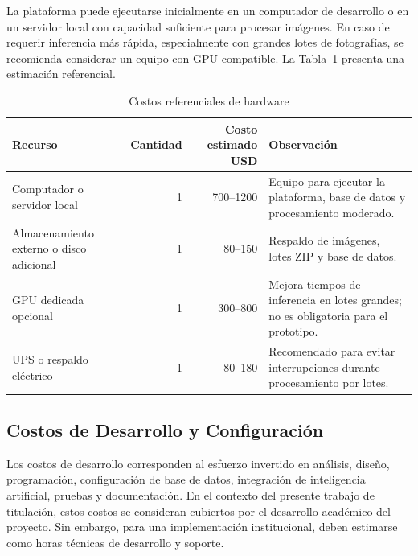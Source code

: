 La plataforma puede ejecutarse inicialmente en un computador de desarrollo o en un servidor local con capacidad suficiente para procesar imágenes. En caso de requerir inferencia más rápida, especialmente con grandes lotes de fotografías, se recomienda considerar un equipo con GPU compatible. La Tabla~\ref{tab:costos_hardware} presenta una estimación referencial.

\begin{table}[H]
\centering
\caption{Costos referenciales de hardware}
\label{tab:costos_hardware}
\begin{tabularx}{\textwidth}{lrrX}
\toprule
\textbf{Recurso} & \textbf{Cantidad} & \textbf{Costo estimado USD} & \textbf{Observación} \\
\midrule
Computador o servidor local & 1 & 700--1200 & Equipo para ejecutar la plataforma, base de datos y procesamiento moderado. \\
Almacenamiento externo o disco adicional & 1 & 80--150 & Respaldo de imágenes, lotes ZIP y base de datos. \\
GPU dedicada opcional & 1 & 300--800 & Mejora tiempos de inferencia en lotes grandes; no es obligatoria para el prototipo. \\
UPS o respaldo eléctrico & 1 & 80--180 & Recomendado para evitar interrupciones durante procesamiento por lotes. \\
\bottomrule
\end{tabularx}
\end{table}

\subsection{Costos de Desarrollo y Configuración}
\label{subsec:costos_desarrollo_configuracion}

Los costos de desarrollo corresponden al esfuerzo invertido en análisis, diseño, programación, configuración de base de datos, integración de inteligencia artificial, pruebas y documentación. En el contexto del presente trabajo de titulación, estos costos se consideran cubiertos por el desarrollo académico del proyecto. Sin embargo, para una implementación institucional, deben estimarse como horas técnicas de desarrollo y soporte.

